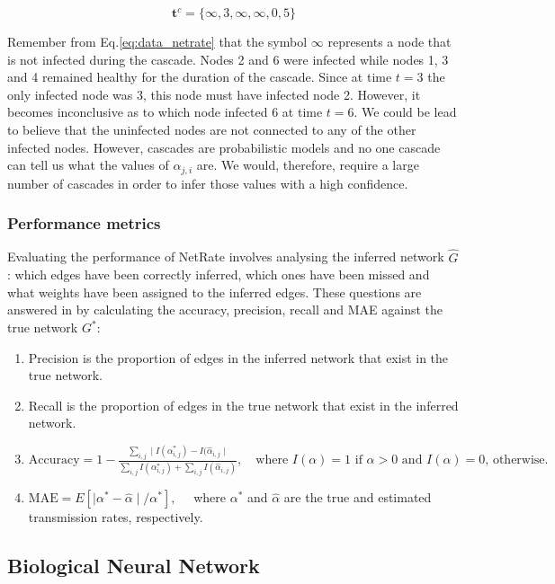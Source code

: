 \documentclass[11pt]{article}
\begin{document}
\begin{equation}\label{eq:cascade_example}
\textbf{t}^{c}=\{\infty, 3, \infty, \infty, 0, 5\}
\end{equation}

Remember from Eq.\ref{eq:data_netrate} that the symbol $\infty $ represents a node that is not infected during the cascade. Nodes 2 and 6 were infected while nodes 1, 3 and 4 remained healthy for the duration of the cascade. Since at time $t=3$ the only infected node was 3, this node must have infected node 2. However, it becomes inconclusive as to which node infected 6 at time $t=6$. We could be lead to believe that the uninfected nodes are not connected to any of the other infected nodes. However, cascades are probabilistic models and no one cascade can tell us what the values of $\alpha_{j,i}$ are. We would, therefore, require a large number of cascades in order to infer those values with a high confidence. 


\subsubsection{Performance metrics}

Evaluating the performance of NetRate involves analysing the inferred network $\hat G$: which edges have been correctly inferred, which ones have been missed and what weights have been assigned to the inferred edges. These questions are answered in \cite{rodriguez2011uncovering} by calculating the accuracy, precision, recall and MAE against the true network $G^{*}$:

\begin{enumerate}
\item Precision is the proportion of edges in the inferred network that exist in the true network.
\item Recall is the proportion of edges in the true network that exist in the inferred network.
\item $\text{Accuracy}=1-\frac{\sum_{i,j}\mid I(\alpha_{i,j}^{*})-I(\hat \alpha_{i,j}\mid}{\sum_{i,j}I(\alpha^{*}_{i,j})+\sum_{i,j}I(\hat \alpha _{i,j})}, \quad \text{where } I(\alpha)=1\text{ if } \alpha > 0\text{ and } I(\alpha)=0\text{, otherwise.}$
\item $\text{MAE} = E[\mid \alpha^{*} - \hat \alpha \mid /\alpha^{*}], \quad $ where $ \alpha^{*}$ and $\hat \alpha $ are the true and estimated transmission rates, respectively.
\end{enumerate}

\subsection{Biological Neural Network}
\end{document}
